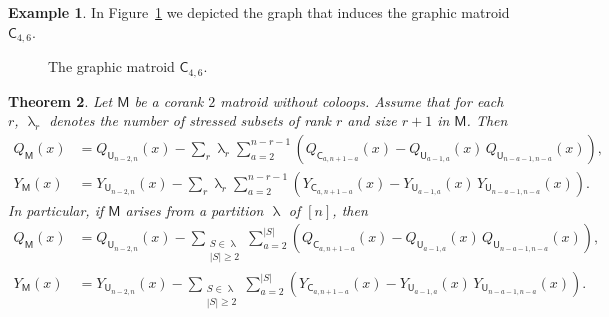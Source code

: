 \documentclass[11pt, a4paper, english]{amsart}
\theoremstyle{teoremas}
\newtheorem{theorem}{Theorem}[section]
\theoremstyle{definition}
\newtheorem{example}[theorem]{Example}
\newcommand{\M}{\mathsf{M}}
\newcommand{\U}{\mathsf{U}}
\newcommand{\C}{\mathsf{C}}
\renewcommand{\lambda}{\uplambda}
\begin{document}
\begin{example}
    In Figure~\ref{fig:two-cycles} we depicted the graph that induces the graphic matroid $\mathsf{C}_{4,6}$.
    \begin{figure}[ht]
        \centering
         \caption{The graphic matroid $\mathsf{C}_{4,6}$.}\label{fig:two-cycles}
    \end{figure}
\end{example}

\begin{theorem}
    Let $\M$ be a corank $2$ matroid without coloops. Assume that for each $r$, $\lambda_r$ denotes the number of stressed subsets of rank $r$ and size $r+1$ in $\M$. Then
    \begin{align*}
        Q_{\M}(x) & = Q_{\U_{n-2,n}}(x) - \sum_{r} \lambda_{r} \sum_{a=2}^{n-r-1} \left(Q_{\C_{a,n+1-a}}(x) - Q_{\U_{a-1,a}}(x)\, Q_{\U_{n-a-1,n-a}}(x)\right), \\
        Y_{\M}(x) & = Y_{\U_{n-2,n}}(x) - \sum_{r} \lambda_{r} \sum_{a=2}^{n-r-1} \left(Y_{\C_{a,n+1-a}}(x) - Y_{\U_{a-1,a}}(x)\, Y_{\U_{n-a-1,n-a}}(x)\right).
    \end{align*}
    In particular, if $\M$ arises from a partition $\lambda$ of $[n]$, then
    \begin{align*}
        Q_{\M}(x) & = Q_{\U_{n-2,n}}(x) - \sum_{\substack{S\in \lambda \\ |S|\geq 2}} \sum_{a=2}^{|S|} \left(Q_{\C_{a,n+1-a}}(x) - Q_{\U_{a-1,a}}(x)\, Q_{\U_{n-a-1,n-a}}(x)\right),\\
        Y_{\M}(x) & = Y_{\U_{n-2,n}}(x) - \sum_{\substack{S\in \lambda \\ |S|\geq 2}}\sum_{a=2}^{|S|} \left(Y_{\C_{a,n+1-a}}(x) - Y_{\U_{a-1,a}}(x)\, Y_{\U_{n-a-1,n-a}}(x)\right).
    \end{align*}
\end{theorem}
\end{document}
